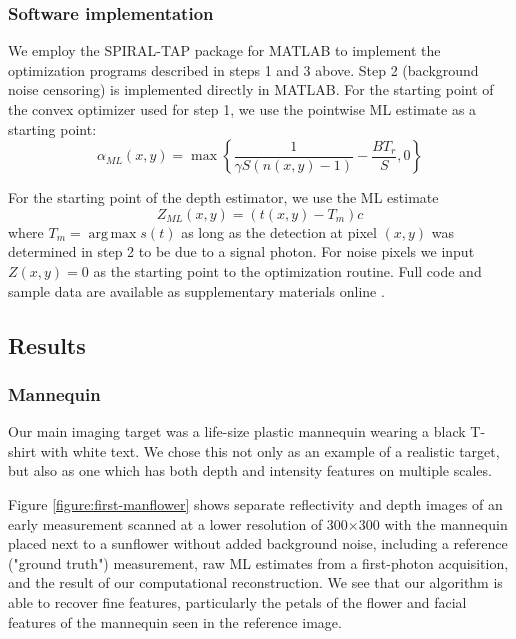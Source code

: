 \subsubsection{Software implementation}
We employ the SPIRAL-TAP package for MATLAB \cite{harmany-spiral} to implement the optimization programs described in steps 1 and 3 above. Step 2 (background noise censoring) is implemented directly in MATLAB. For the starting point of the convex optimizer used for step 1, we use the pointwise ML estimate as a starting point:
\begin{equation}
\alpha_{ML}(x,y) = \operatorname{max}\left\{ \frac{1}{\gamma S (n(x,y) - 1)} - \frac{BT_r}{S}, 0 \right\}
\end{equation}

For the starting point of the depth estimator, we use the ML estimate
\begin{equation}
Z_{ML}(x,y) = (t(x,y) - T_m)c
\end{equation}
where $T_m = \operatorname{arg\,max} s(t)$ as long as the detection at pixel $(x,y)$ was determined in step 2 to be due to a signal photon. For noise pixels we input $Z(x,y) = 0$ as the starting point to the optimization routine. Full code and sample data are available as supplementary materials online \cite{kirmani-first}.

\subsection{Results}

\subsubsection{Mannequin}
Our main imaging target was a life-size plastic mannequin wearing a black T-shirt with white text. We chose this not only as an example of a realistic target, but also as one which has both depth and intensity features on multiple scales.

Figure \ref{figure:first-manflower} shows separate reflectivity and depth images of an early measurement scanned at a lower resolution of 300$\times$300 with the mannequin placed next to a sunflower without added background noise, including a reference ("ground truth") measurement, raw ML estimates from a first-photon acquisition, and the result of our computational reconstruction. We see that our algorithm is able to recover fine features, particularly the petals of the flower and facial features of the mannequin seen in the reference image.

